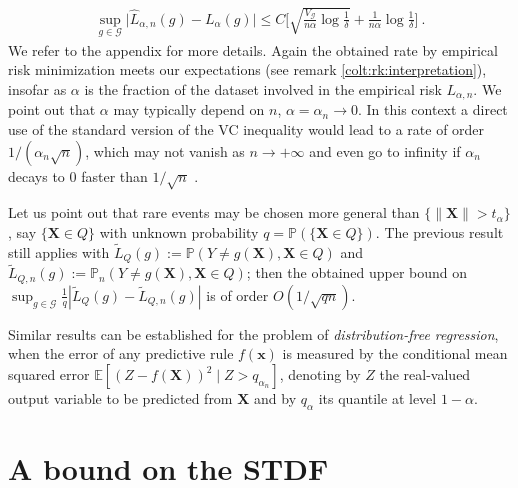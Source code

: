 \begin{remark}
\begin{align}
\sup_{g\in \mathcal{G}} \bigg| \widehat{L}_{\alpha, n}(g)- L_{\alpha}(g) \bigg|  \le C \bigg[ \sqrt{\frac{V_{\mathcal{G}}}{n\alpha} \log \frac{1}{\delta}} + \frac{1}{n\alpha} \log{\frac{1}{\delta}} \bigg]~.
\end{align}
We refer to the appendix for more details. Again the obtained rate by
empirical risk minimization  meets our expectations (see remark \ref{colt:rk:interpretation}), insofar as $\alpha$ is the fraction %
of the dataset involved in the empirical risk $L_{\alpha, n}$. We point out that $\alpha$ may typically depend on $n$, $\alpha = \alpha_n \to 0$.
In this context a direct use of the 
standard version of the \textsc{VC} inequality would lead to a rate  of order $1/(\alpha_n\sqrt{n})$, which may not vanish as $n\rightarrow +\infty$ and even go to infinity if $\alpha_n$ decays to $0$ faster than $1/\sqrt{n}$ . 

Let us point out that rare events may be chosen more general than
$\{\|\mathbf{X}\| > t_\alpha \}$, say $\{\mathbf{X} \in Q \}$ with unknown probability
$q=\mathbb{P}(\{\mathbf{X} \in Q \})$. The previous result still applies with
$\widetilde L_Q(g) := \mathbb{P}\left ( Y \neq g(\mathbf{X}), \mathbf{X} \in Q\right)$
and $\widetilde L_{Q,n}(g) := \mathbb{P}_n\left ( Y \neq g(\mathbf{X}), \mathbf{X} \in
  Q\right)$; then the obtained upper bound on $\sup_{g \in
  \mathcal{G}} \frac{1}{q} \left |  \widetilde L_Q(g) - \widetilde
  L_{Q,n}(g) \right|$ is of order $O(1/\sqrt{qn}). $ %

Similar results can be established for the problem of \textit{distribution-free regression}, when the error of any predictive rule $f(\mathbf{x})$ is measured by the conditional mean squared error $\mathbb{E}[(Z-f(\mathbf{X}))^2\mid Z>q_{\alpha_n}]$, denoting by $Z$ the real-valued output variable to be predicted from $\mathbf{X}$ and by $q_{\alpha}$ its quantile at level $1-\alpha$.


\end{remark}




\section{A bound on the STDF}
\label{colt:sec:stdf}


